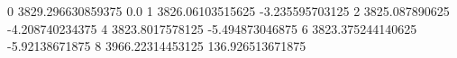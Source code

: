 0 3829.296630859375 0.0
1 3826.06103515625 -3.235595703125
2 3825.087890625 -4.208740234375
4 3823.8017578125 -5.494873046875
6 3823.375244140625 -5.92138671875
8 3966.22314453125 136.926513671875
